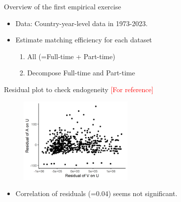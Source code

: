 \documentclass[aspectratio=169]{beamer}
\begin{document}
\begin{frame}{Overview of the first empirical exercise}
    \begin{itemize}
        \item Data: Country-year-level data in 1973-2023.
        \item Estimate matching efficiency for each dataset
        \begin{enumerate}
            \item All (=Full-time + Part-time)
            \item Decompose Full-time and Part-time
        \end{enumerate}
    \end{itemize}
\end{frame}

\begin{frame}{Residual plot to check endogeneity \textcolor{red}{[For reference]}}
    \begin{figure}[!ht]
  \begin{center}
  \includegraphics[width = 0.50\textwidth]
  {figuretable/residual_plot_month_aggregate.png}
  \end{center}
  \footnotesize
\end{figure} 
\begin{itemize}
    \item Correlation of residuals (=0.04) seems not significant.
\end{itemize}
\end{frame}
\end{document}

